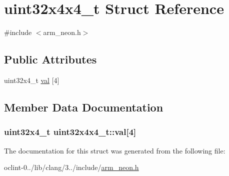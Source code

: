\hypertarget{structuint32x4x4__t}{\section{uint32x4x4\-\_\-t Struct Reference}
\label{structuint32x4x4__t}
}


{\ttfamily \#include $<$arm\-\_\-neon.\-h$>$}

\subsection*{Public Attributes}
\begin{DoxyCompactItemize}
\item 
uint32x4\-\_\-t \hyperlink{structuint32x4x4__t_a2aacabec36073a60e874900139cc050a}{val} \mbox{[}4\mbox{]}
\end{DoxyCompactItemize}


\subsection{Member Data Documentation}
\hypertarget{structuint32x4x4__t_a2aacabec36073a60e874900139cc050a}{
\subsubsection[{val}]{\setlength{\rightskip}{0pt plus 5cm}uint32x4\-\_\-t uint32x4x4\-\_\-t\-::val\mbox{[}4\mbox{]}}}\label{structuint32x4x4__t_a2aacabec36073a60e874900139cc050a}


The documentation for this struct was generated from the following file\-:\begin{DoxyCompactItemize}
\item 
oclint-\/0../lib/clang/3../include/\hyperlink{arm__neon_8h}{arm\-\_\-neon.\-h}\end{DoxyCompactItemize}
